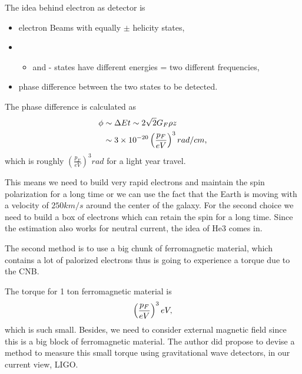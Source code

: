 \documentclass[letterpaper,12pt,english]{sphinxmanual}
\begin{document}
The idea behind electron as detector is
\begin{itemize}
\item {} 
electron Beams with equally \(\pm\) helicity states,

\item {} \begin{itemize}
\item {} 
and - states have different energies = two different frequencies,

\end{itemize}

\item {} 
phase difference between the two states to be detected.

\end{itemize}

The phase difference is calculated as
\begin{gather}
\begin{split}\phi &\sim \Delta E t  \sim 2\sqrt{2}G_F \rho z \\
& \sim 3\times 10^{-20} \left( \frac{p_F}{eV} \right)^3 rad/cm,\end{split}\notag
\end{gather}
which is roughly \(\left( \frac{p_F}{eV} \right)^3 rad\) for a light year travel.

This means we need to build very rapid electrons and maintain the spin polarization for a long time or we can use the fact that the Earth is moving with a velocity of \(250 km/s\) around the center of the galaxy. For the second choice we need to build a box of electrons which can retain the spin for a long time. Since the estimation also works for neutral current, the idea of He3 comes in.

The second method is to use a big chunk of ferromagnetic material, which contains a lot of palorized electrons thus is going to experience a torque due to the CNB.

The torque for 1 ton ferromagnetic material is
\begin{gather}
\begin{split}\left( \frac{p_F}{eV}\right)^3 eV,\end{split}\notag
\end{gather}
which is such small. Besides, we need to consider external magnetic field since this is a big block of ferromagnetic material. The author did propose to devise a method to measure this small torque using gravitational wave detectors, in our current view, LIGO.
\end{document}
